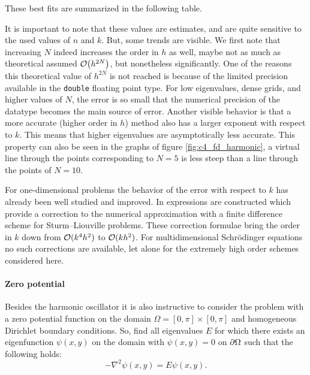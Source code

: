 These best fits are summarized in the following table.
\begin{center}
    
\end{center}

It is important to note that these values are estimates, and are quite sensitive to the used values of $n$ and $k$. But, some trends are visible. We first note that increasing $N$ indeed increases the order in $h$ as well, maybe not as much as theoretical assumed $\OO\mleft(h^{2N}\mright)$, but nonetheless significantly. One of the reasons this theoretical value of $h^{2N}$ is not reached is because of the limited precision available in the \texttt{double} floating point type. For low eigenvalues, dense grids, and higher values of $N$, the error is so small that the numerical precision of the datatype becomes the main source of error. Another visible behavior is that a more accurate (higher order in $h$) method also has a larger exponent with respect to $k$. This means that higher eigenvalues are asymptotically less accurate. This property can also be seen in the graphs of figure \ref{fig:c4_fd_harmonic}, a virtual line through the points corresponding to $N = 5$ is less steep than a line through the points of $N = 10$.

For one-dimensional problems the behavior of the error with respect to $k$ has already been well studied and improved. In \cite{paine_correction_1981} expressions are constructed which provide a correction to the numerical approximation with a finite difference scheme for Sturm--Liouville problems. These correction formulae bring the order in $k$ down from $\operatorname{\mathcal{O}}(k^4h^2)$ to $\operatorname{\mathcal{O}}(k h^2)$. For multidimensional Schrödinger equations no such corrections are available, let alone for the extremely high order schemes considered here.

\paragraph{Zero potential} Besides the harmonic oscillator it is also instructive to consider the problem with a zero potential function on the domain $\Omega = [0, \pi] \times [0, \pi]$ and homogeneous Dirichlet boundary conditions. So, find all eigenvalues $E$ for which there exists an eigenfunction $\psi(x, y)$ on the domain with $\psi(x, y) = 0$ on $\partial\Omega$ such that the following holds:
\begin{equation}\label{equ:c4_fd_zero}
    -\nabla^2 \psi(x, y) = E \psi(x, y) \text{.}
\end{equation}

